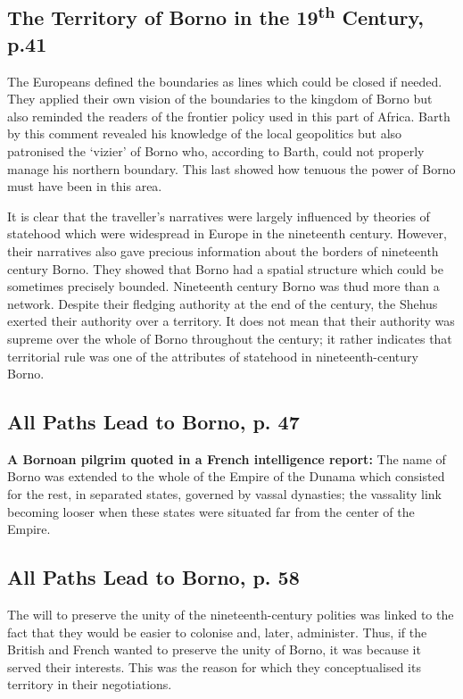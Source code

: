 \documentclass[12pt]{article}
\begin{document}
\subsection{The Territory of Borno in the 19\textsuperscript{th} Century, p.41}

The Europeans defined the boundaries as lines which could be closed if needed.
They applied their own vision of the boundaries to the kingdom of Borno but
also reminded the readers of the frontier policy used in this part of Africa.
Barth by this comment revealed his knowledge of the local geopolitics but also
patronised the `vizier' of Borno who, according to Barth, could not properly
manage his northern boundary. This last showed how tenuous the power of Borno
must have been in this area.

It is clear that the traveller's narratives were largely influenced by theories
of statehood which were widespread in Europe in the nineteenth century. However,
their narratives also gave precious information about the borders of nineteenth
century Borno. They showed that Borno had a spatial structure which could be
sometimes precisely bounded. Nineteenth century Borno was thud more than a
network. Despite their fledging authority at the end of the century, the Shehus
exerted their authority over a territory. It does not mean that their authority
was supreme over the whole of Borno throughout the century; it rather indicates
that territorial rule was one of the attributes of statehood in
nineteenth-century Borno.

\subsection{All Paths Lead to Borno, p. 47}

\textbf{A Bornoan pilgrim quoted in a French intelligence report:}
The name of Borno was extended to the whole of the Empire of the Dunama which
consisted for the rest, in separated states, governed by vassal dynasties; the
vassality link becoming looser when these states were situated far from the
center of the Empire.

\subsection{All Paths Lead to Borno, p. 58}

The will to preserve the unity of the nineteenth-century polities was linked to
the fact that they would be easier to colonise and, later, administer. Thus, if
the British and French wanted to preserve the unity of Borno, it was because it
served their interests. This was the reason for which they conceptualised its
territory in their negotiations.
\end{document}
